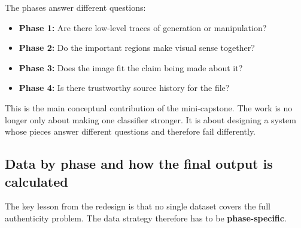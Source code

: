 \documentclass[11pt]{article}
\begin{document}
\begin{center}
\end{center}

The phases answer different questions:
\begin{itemize}[leftmargin=1.5em]
    \item \textbf{Phase 1:} Are there low-level traces of generation or manipulation?
    \item \textbf{Phase 2:} Do the important regions make visual sense together?
    \item \textbf{Phase 3:} Does the image fit the claim being made about it?
    \item \textbf{Phase 4:} Is there trustworthy source history for the file?
\end{itemize}

This is the main conceptual contribution of the mini-capstone. The work is no longer only about making one classifier stronger. It is about designing a system whose pieces answer different questions and therefore fail differently.


\subsection{Data by phase and how the final output is calculated}

The key lesson from the redesign is that no single dataset covers the full authenticity problem. The data strategy therefore has to be \textbf{phase-specific}.
\end{document}
